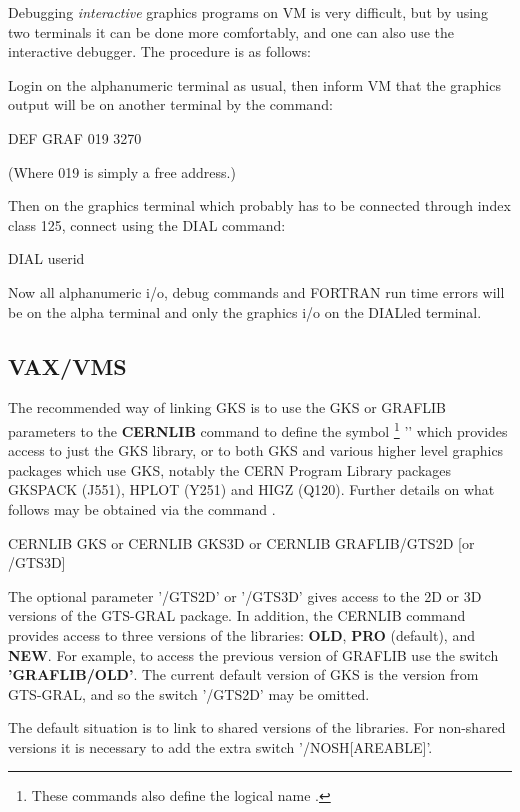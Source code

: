 Debugging {\it interactive} graphics programs on VM is very difficult,
but by using two terminals it can be done more comfortably, and one can
also use the interactive debugger. The procedure is as follows:
\begin{OL}
\item Login on the alphanumeric terminal as usual, then inform VM that
the graphics output will be on another terminal by the command:
\begin{XMP}
DEF GRAF 019 3270
\end{XMP}
(Where 019 is simply a free address.)
\item Then on the graphics terminal which probably has to be connected
through index class 125, connect using the DIAL command:
\begin{XMP}
DIAL userid
\end{XMP}
\end{OL}
Now all alphanumeric i/o, debug commands and FORTRAN run time errors
will be on the alpha terminal and only the graphics i/o on the DIALled
terminal.
\subsection{VAX/VMS}
 
The recommended way of linking GKS is to use the GKS or GRAFLIB parameters
to the {\bf CERNLIB} command to define the symbol%
\footnote{These commands also define the logical name .}
'' which provides access to just
the GKS library, or to both GKS and various higher level graphics
packages which use GKS, notably the CERN Program Library packages
GKSPACK (J551), HPLOT (Y251) and HIGZ (Q120).
Further details on what follows may be obtained via the command
.
\begin{XMP}
CERNLIB GKS
        or
CERNLIB GKS3D
        or
CERNLIB GRAFLIB/GTS2D        [or /GTS3D]
\end{XMP}
The optional parameter '/GTS2D' or '/GTS3D' gives access to the 2D or 3D
versions of the GTS-GRAL package.
In addition, the CERNLIB command provides access to three versions
of the libraries: {\bf OLD}, {\bf PRO} (default), and {\bf NEW}.
For example, to access the previous version of GRAFLIB use the switch
{\bf 'GRAFLIB/OLD'}.
The current default version of GKS is the version from GTS-GRAL,
and so the switch '/GTS2D' may be omitted.
 
The default situation is to link to shared versions of the libraries.
For non-shared versions it is necessary to add the extra switch
'/NOSH[AREABLE]'.
 
